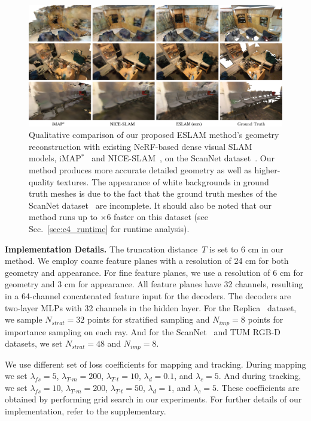 \begin{figure}[t]
    \begin{center}
        \includegraphics[width=1.0\linewidth]{images/chapter4/figures/Fig5.jpg}
    \end{center}
    \caption{Qualitative comparison of our proposed ESLAM method's geometry reconstruction with existing NeRF-based dense visual SLAM models, iMAP$^*$~\cite{sucar2021imap} and NICE-SLAM~\cite{zhu2022nice}, on the ScanNet dataset~\cite{dai2017scannet}. Our method produces more accurate detailed geometry as well as higher-quality textures. The appearance of white backgrounds in ground truth meshes is due to the fact that the ground truth meshes of the ScanNet dataset~\cite{dai2017scannet} are incomplete. It should also be noted that our method runs up to $\times$6 faster on this dataset (see Sec.~\ref{sec:c4_runtime} for runtime analysis).}
    \label{fig:c4_qualitative_scannet}
\end{figure}

\vspace{1ex}
\noindent\textbf{Implementation Details.} The truncation distance~$T$ is set to 6 cm in our method. We employ coarse feature planes with a resolution of 24 cm for both geometry and appearance. For fine feature planes, we use a resolution of 6 cm for geometry and 3 cm for appearance. All feature planes have 32 channels, resulting in a 64-channel concatenated feature input for the decoders. The decoders are two-layer MLPs with 32 channels in the hidden layer. For the Replica~\cite{replica19arxiv} dataset, we sample $N_{strat}=32$ points for stratified sampling and $N_{imp}=8$ points for importance sampling on each ray. And for the ScanNet~\cite{dai2017scannet} and TUM RGB-D~\cite{sturm2012benchmark} datasets, we set $N_{strat}=48$ and $N_{imp}=8$.

We use different set of loss coefficients for mapping and tracking. During mapping we set $\lambda_{fs}=5$, $\lambda_{T\text{-}m}=200$, $\lambda_{T\text{-}t}=10$, $\lambda_{d}=0.1$, and $\lambda_{c}=5$. And during tracking, we set $\lambda_{fs}=10$, $\lambda_{T\text{-}m}=200$, $\lambda_{T\text{-}t}=50$, $\lambda_{d}=1$, and $\lambda_{c}=5$. These coefficients are obtained by performing grid search in our experiments. For further details of our implementation, refer to the supplementary.

